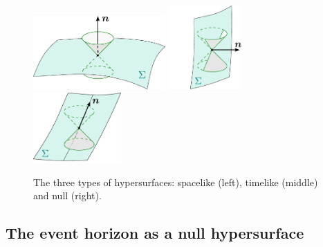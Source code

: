 \begin{figure}
\centerline{\includegraphics[width=0.45\textwidth]{def_spacelike_hyp.pdf}
\includegraphics[width=0.25\textwidth]{def_timelike_hyp.pdf}
\includegraphics[width=0.30\textwidth]{def_null_hyp.pdf}}
\caption[]{\label{f:def:hypersurfaces} \footnotesize
The three types of hypersurfaces:
spacelike (left), timelike (middle) and null (right).}
\end{figure}

\subsection{The event horizon as a null hypersurface} \label{s:def:hor_as_null}

